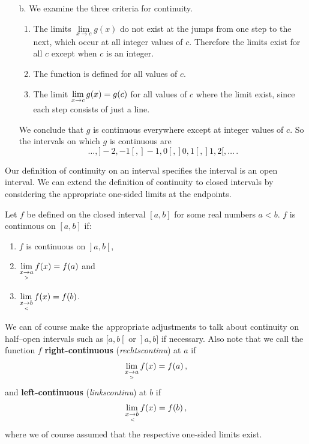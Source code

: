 \begin{example}
\begin{enumerate}
We conclude that $f$ is continuous at every point of $]0,3[$ except at $x=1$. Therefore $f$ is continuous on $\left.\right]0,1\left[\right.$ and $\left.\right]1,3\left[\right.$.
\item [b.] We examine the three criteria for continuity.
		\begin{enumerate}
		\item		The limits $\lim\limits_{x\to c} g(x)$ do not exist at the jumps from one step to the next, which occur at all integer values of $c$. Therefore the limits exist for all $c$ except when $c$ is an integer.
		\item		The function is defined for all values of $c$.
		\item		The limit $\displaystyle \lim_{x\to c} g(x) = g(c)$ for all values of $c$ where the limit exist, since each step consists of just a line. 
		\end{enumerate}
		We conclude that $g$ is continuous everywhere except at integer values of $c$. So the intervals on which $g$ is continuous are $$\ldots, ]-2,-1[, ]-1,0[, ]0,1[, ]1,2[, \ldots\,.$$
		\end{enumerate}
\end{example}

Our definition of continuity on an interval specifies the interval is an open interval. We can extend the definition of continuity to closed intervals by considering the appropriate one-sided limits at the endpoints.

\begin{definition}\label{def:closed_continuity}
Let $f$ be defined on the closed interval $[a,b]$ for some real numbers $a<b$. $f$ is continuous on $[a,b]$ if:
		\begin{enumerate}
		\item		$f$ is continuous on $\left.\right]a,b\left[\right.$,
		\item		$\displaystyle \lim_{x\underset{>}{\rightarrow}a} f(x) = f(a)$ and 
		\item		$\displaystyle \lim_{x\underset{<}{\rightarrow}b} f(x) = f(b)$.
		\end{enumerate}
\end{definition}	
		
We can of course make the appropriate adjustments to talk about continuity on half--open intervals such as $[a,b\left[\right.$ or $\left.\right]a,b]$ if necessary. Also note that we call the function $f$ \textbf{right-continuous} (\textit{rechtscontinu}) at $a$ if
$$\displaystyle \lim_{x\underset{>}{\rightarrow}a} f(x) = f(a)\,,$$
and \textbf{left-continuous} (\textit{linkscontinu}) at $b$ if
$$\displaystyle \lim_{x\underset{<}{\rightarrow}b} f(x) = f(b)\,,$$
where we of course assumed that the respective one-sided limits exist. 

